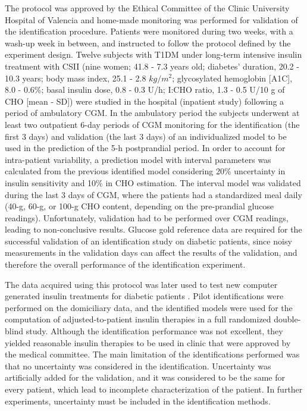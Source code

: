 The protocol was approved by the Ethical Committee of the Clinic University Hospital of Valencia and home-made monitoring was performed for validation of the identification procedure. Patients were monitored during two weeks, with a wash-up week in between, and instructed to follow the protocol defined by the experiment design. Twelve subjects with T1DM under long-term intensive insulin treatment with CSII (nine women; 41.8 - 7.3 years old; diabetes' duration, 20.2 - 10.3 years; body mass index, 25.1 - 2.8 $kg/m^2$; glycosylated hemoglobin [A1C], 8.0 - 0.6\%; basal insulin dose, 0.8 - 0.3 U/h; I:CHO ratio, 1.3 - 0.5 U/10 g of CHO [mean - SD]) were studied in the hospital (inpatient study) following a period of ambulatory CGM. In the ambulatory period the subjects underwent at least two outpatient 6-day periods of CGM monitoring for the identification (the first 3 days) and validation (the last 3 days) of an individualized model to be used in the prediction of the 5-h postprandial period. In order to account for intra-patient variability, a prediction model with interval parameters was calculated from the previous identified model considering 20\% uncertainty in insulin sensitivity and 10\% in CHO estimation. The interval model was validated during the last 3 days of CGM, where the patients had a standardized meal daily (40-g, 60-g, or 100-g CHO content, depending on the pre-prandial glucose readings). Unfortunately, validation had to be performed over CGM readings, leading to non-conclusive results. Glucose gold reference data are required for the successful validation of an identification study on diabetic patients, since noisy measurements in the validation days can affect the results of the validation, and therefore the overall performance of the identification experiment.

The data acquired using this protocol was later used to test new computer generated insulin treatments for diabetic patients \cite{paoloibolus2012}. Pilot identifications were performed on the domiciliary data, and the identified models were used for the computation of adjusted-to-patient insulin therapies in a full randomized double-blind study. Although the identification performance was not excellent, they yielded reasonable insulin therapies to be used in clinic that were approved by the medical committee. The main limitation of the identifications performed was that no uncertainty was considered in the identification. Uncertainty was artificially added for the validation, and it was considered to be the same for every patient, which lead to incomplete characterization of the patient. In further experiments, uncertainty must be included in the identification methods.

